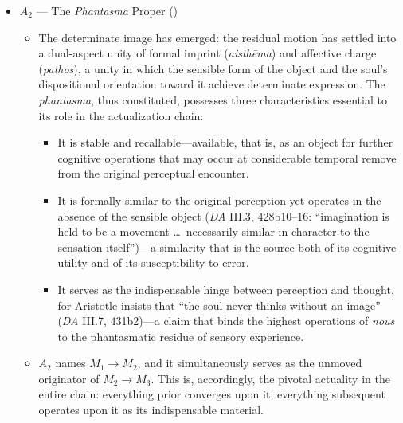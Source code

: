 \begin{itemize}
      \item $A_2$ --- The \textit{Phantasma} Proper ()
      \begin{itemize}
          \item The determinate image has emerged: the residual motion has settled
          into a dual-aspect unity of formal imprint (\textit{aisthēma}) and
          affective charge (\textit{pathos}), a unity in which the sensible form of
          the object and the soul's dispositional orientation toward it achieve
          determinate expression. The \textit{phantasma}, thus constituted, possesses
          three characteristics essential to its role in the actualization chain:
          \begin{itemize}
              \item It is stable and recallable---available, that is, as an object
              for further cognitive operations that may occur at considerable
              temporal remove from the original perceptual encounter.
              \item It is formally similar to the original perception yet operates
              in the absence of the sensible object (\textit{DA} III.3, 428b10--16:
              ``imagination is held to be a movement \ldots\ necessarily similar in
              character to the sensation itself'')---a similarity that is the source
              both of its cognitive utility and of its susceptibility to error.
              \item It serves as the indispensable hinge between perception and
              thought, for Aristotle insists that ``the soul never thinks without an
              image'' (\textit{DA} III.7, 431b2)---a claim that binds the highest
              operations of \textit{nous} to the phantasmatic residue of sensory
              experience.
          \end{itemize}
          \item $A_2$ names $M_1 \rightarrow M_2$, and it simultaneously serves as
          the unmoved originator of $M_2 \rightarrow M_3$. This is, accordingly, the
          pivotal actuality in the entire chain: everything prior converges upon it;
          everything subsequent operates upon it as its indispensable material.


\end{itemize}
\end{itemize}
